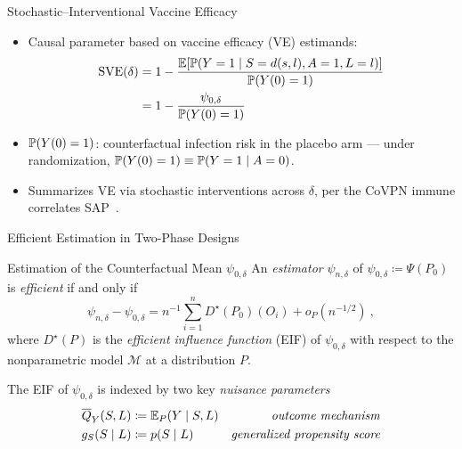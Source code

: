 \documentclass{beamer}
\begin{document}
\begin{frame}[c]{Stochastic--Interventional Vaccine Efficacy}

\begin{center}
\begin{itemize}
  \itemsep8pt
  \item Causal parameter based on vaccine efficacy (VE) estimands:
  \begin{align*}
    \text{SVE}(\delta) &= 1 - \frac{\mathbb{E}[\mathbb{P}(Y = 1 \mid S = d(s, l), A = 1,
                                    L = l)]}{\mathbb{P}(Y(0)=1)} \\
                       &= 1 - \frac{\psi_{0, \delta}}{\mathbb{P}(Y(0)=1)}
  \end{align*}
  \item $\mathbb{P}(Y(0)=1)$: counterfactual infection risk in the placebo arm ---
    under randomization, $\mathbb{P}(Y(0)=1) \equiv \mathbb{P}(Y=1 \mid A=0)$.
  \item Summarizes VE via stochastic interventions across $\delta$, per the
    CoVPN immune correlates SAP\footnotemark~\citep{gilbert2021covpn,
    gilbert2021immune}.
\end{itemize}
\end{center}

\note{
}


\end{frame}


\begin{frame}[standout]
  Efficient Estimation in Two-Phase Designs
\end{frame}


\begin{frame}{Estimation of the Counterfactual Mean $\psi_{0,\delta}$}
An \textit{estimator} $\psi_{n,\delta}$ of $\psi_{0,\delta} \coloneqq \Psi(P_0)$
is \textit{efficient} if and only if
\[
  \psi_{n,\delta} - \psi_{0, \delta} = n^{-1} \sum\limits_{i=1}^n
  D^{\star}(P_0)(O_i) + o_P(n^{-1/2}) \ ,
\]
where $D^{\star}(P)$ is the \textit{efficient influence function} (EIF) of
$\psi_{0,\delta}$ with respect to the nonparametric model $\mathcal{M}$ at a
distribution $P$.
\vspace{0.25cm}

The EIF of $\psi_{0,\delta}$ is indexed by two key \textit{nuisance parameters}
\begin{align*}
  \overline{Q}_{Y}(S,L) &\coloneqq \mathbb{E}_{P}(Y \mid S, L) &
      \mbox{\textit{outcome mechanism}} \\
  g_{S}(S \mid L) &\coloneqq p(S \mid L) &
    \mbox{\textit{generalized propensity score}}
\end{align*}

\note{
}

\end{frame}
\end{document}
